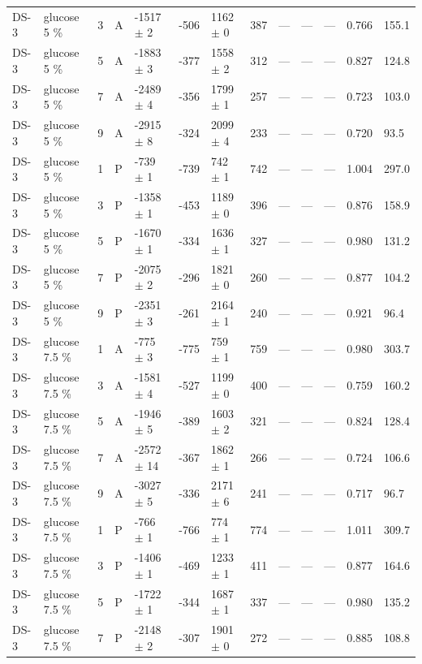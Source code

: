 \documentclass[11pt,a4paper]{article}
\begin{document}
\begin{landscape}
{\begin{longtable}{@{}lllllllllllll@{}}
DS-3 & glucose 5 \% & 3 & A & -1517 $\pm$ 2 & -506 & 1162 $\pm$ 0 & 387 & --- & --- & --- & 0.766 & 155.1 \\
DS-3 & glucose 5 \% & 5 & A & -1883 $\pm$ 3 & -377 & 1558 $\pm$ 2 & 312 & --- & --- & --- & 0.827 & 124.8 \\
DS-3 & glucose 5 \% & 7 & A & -2489 $\pm$ 4 & -356 & 1799 $\pm$ 1 & 257 & --- & --- & --- & 0.723 & 103.0 \\
DS-3 & glucose 5 \% & 9 & A & -2915 $\pm$ 8 & -324 & 2099 $\pm$ 4 & 233 & --- & --- & --- & 0.720 & 93.5 \\
DS-3 & glucose 5 \% & 1 & P & -739 $\pm$ 1 & -739 & 742 $\pm$ 1 & 742 & --- & --- & --- & 1.004 & 297.0 \\
DS-3 & glucose 5 \% & 3 & P & -1358 $\pm$ 1 & -453 & 1189 $\pm$ 0 & 396 & --- & --- & --- & 0.876 & 158.9 \\
DS-3 & glucose 5 \% & 5 & P & -1670 $\pm$ 1 & -334 & 1636 $\pm$ 1 & 327 & --- & --- & --- & 0.980 & 131.2 \\
DS-3 & glucose 5 \% & 7 & P & -2075 $\pm$ 2 & -296 & 1821 $\pm$ 0 & 260 & --- & --- & --- & 0.877 & 104.2 \\
DS-3 & glucose 5 \% & 9 & P & -2351 $\pm$ 3 & -261 & 2164 $\pm$ 1 & 240 & --- & --- & --- & 0.921 & 96.4 \\
DS-3 & glucose 7.5 \% & 1 & A & -775 $\pm$ 3 & -775 & 759 $\pm$ 1 & 759 & --- & --- & --- & 0.980 & 303.7 \\
DS-3 & glucose 7.5 \% & 3 & A & -1581 $\pm$ 4 & -527 & 1199 $\pm$ 0 & 400 & --- & --- & --- & 0.759 & 160.2 \\
DS-3 & glucose 7.5 \% & 5 & A & -1946 $\pm$ 5 & -389 & 1603 $\pm$ 2 & 321 & --- & --- & --- & 0.824 & 128.4 \\
DS-3 & glucose 7.5 \% & 7 & A & -2572 $\pm$ 14 & -367 & 1862 $\pm$ 1 & 266 & --- & --- & --- & 0.724 & 106.6 \\
DS-3 & glucose 7.5 \% & 9 & A & -3027 $\pm$ 5 & -336 & 2171 $\pm$ 6 & 241 & --- & --- & --- & 0.717 & 96.7 \\
DS-3 & glucose 7.5 \% & 1 & P & -766 $\pm$ 1 & -766 & 774 $\pm$ 1 & 774 & --- & --- & --- & 1.011 & 309.7 \\
DS-3 & glucose 7.5 \% & 3 & P & -1406 $\pm$ 1 & -469 & 1233 $\pm$ 1 & 411 & --- & --- & --- & 0.877 & 164.6 \\
DS-3 & glucose 7.5 \% & 5 & P & -1722 $\pm$ 1 & -344 & 1687 $\pm$ 1 & 337 & --- & --- & --- & 0.980 & 135.2 \\
DS-3 & glucose 7.5 \% & 7 & P & -2148 $\pm$ 2 & -307 & 1901 $\pm$ 0 & 272 & --- & --- & --- & 0.885 & 108.8 \\

\end{longtable}}
\end{landscape}
\end{document}
